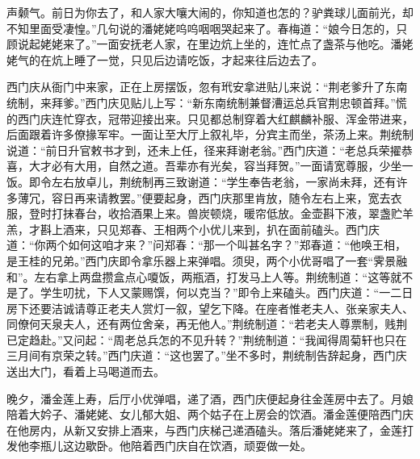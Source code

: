 声颡气。前日为你去了，和人家大嚷大闹的，你知道也怎的？驴粪球儿面前光，却不知里面受凄惶。”几句说的潘姥姥呜呜咽咽哭起来了。春梅道：“娘今日怎的，只顾说起姥姥来了。”一面安抚老人家，在里边炕上坐的，连忙点了盏茶与他吃。潘姥姥气的在炕上睡了一觉，只见后边请吃饭，才起来往后边去了。

西门庆从衙门中来家，正在上房摆饭，忽有玳安拿进贴儿来说：“荆老爹升了东南统制，来拜爹。”西门庆见贴儿上写：“新东南统制兼督漕运总兵官荆忠顿首拜。”慌的西门庆连忙穿衣，冠带迎接出来。只见都总制穿着大红麒麟补服、浑金带进来，后面跟着许多僚掾军牢。一面让至大厅上叙礼毕，分宾主而坐，茶汤上来。荆统制说道：“前日升官敕书才到，还未上任，径来拜谢老翁。”西门庆道：“老总兵荣擢恭喜，大才必有大用，自然之道。吾辈亦有光矣，容当拜贺。”一面请宽尊服，少坐一饭。即令左右放卓儿，荆统制再三致谢道：“学生奉告老翁，一家尚未拜，还有许多薄冗，容日再来请教罢。”便要起身，西门庆那里肯放，随令左右上来，宽去衣服，登时打抹春台，收拾酒果上来。兽炭顿烧，暖帘低放。金壶斟下液，翠盏贮羊羔，才斟上酒来，只见郑春、王相两个小优儿来到，扒在面前磕头。西门庆道：“你两个如何这咱才来？”问郑春：“那一个叫甚名字？”郑春道：“他唤王相，是王桂的兄弟。”西门庆即令拿乐器上来弹唱。须臾，两个小优哥唱了一套“霁景融和”。左右拿上两盘攒盒点心嗄饭，两瓶酒，打发马上人等。荆统制道：“这等就不是了。学生叨扰，下人又蒙赐馔，何以克当？”即令上来磕头。西门庆道：“一二日房下还要洁诚请尊正老夫人赏灯一叙，望乞下降。在座者惟老夫人、张亲家夫人、同僚何天泉夫人，还有两位舍亲，再无他人。”荆统制道：“若老夫人尊票制，贱荆已定趋赴。”又问起：“周老总兵怎的不见升转？”荆统制道：“我闻得周菊轩也只在三月间有京荣之转。”西门庆道：“这也罢了。”坐不多时，荆统制告辞起身，西门庆送出大门，看着上马喝道而去。

晚夕，潘金莲上寿，后厅小优弹唱，递了酒，西门庆便起身往金莲房中去了。月娘陪着大妗子、潘姥姥、女儿郁大姐、两个姑子在上房会的饮酒。潘金莲便陪西门庆在他房内，从新又安排上酒来，与西门庆梯己递酒磕头。落后潘姥姥来了，金莲打发他李瓶儿这边歇卧。他陪着西门庆自在饮酒，顽耍做一处。

